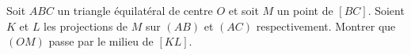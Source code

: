 Soit $ABC$ un triangle équilatéral de centre $O$ et soit $M$ un point de $[BC]$. Soient $K$ et $L$ les projections de $M$ sur $(AB)$ et $(AC)$ respectivement. Montrer que $(OM)$ passe par le milieu de $[KL]$.